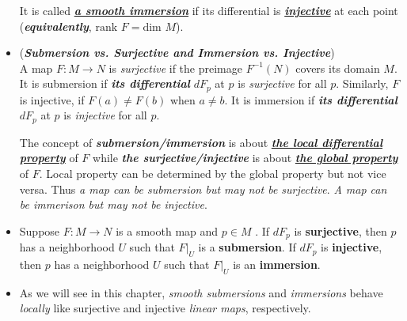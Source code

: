 \documentclass[11pt]{article}
\begin{document}
\begin{itemize}
\begin{definition}
It is called \underline{\emph{\textbf{a smooth immersion}}} if its differential is \underline{\emph{\textbf{injective}}} at each point (\emph{\textbf{equivalently}}, \underline{$\text{rank }F = \text{dim }M$}).
\end{definition}


\item \begin{remark} (\emph{\textbf{Submersion vs. Surjective and Immersion vs. Injective}})\\
A map $F: M \rightarrow N$ is \emph{surjective} if the preimage $F^{-1}(N)$ covers its domain $M$. It is submersion if \emph{\textbf{its differential}} $dF_p$ at $p$ is \emph{surjective} for all $p$. Similarly, $F$ is injective, if $F(a) \neq F(b)$ when $a \neq b$. It is immersion if \emph{\textbf{its differential}} $dF_p$ at $p$ is \emph{injective} for all $p$. 

The concept of \emph{\textbf{submersion/immersion}} is about \underline{\emph{\textbf{the local differential property}}} of $F$ while \emph{\textbf{the surjective/injective}} is about \underline{\emph{\textbf{the global property}}} of $F$.  Local property can be determined by the global property but not vice versa. Thus \emph{a map can be submersion but may not be surjective}.  \emph{A map can be immerison but may not be injective}. 
\end{remark}


\item \begin{proposition}
Suppose $F: M \rightarrow N$ is a smooth map and $p \in M$ . If $dF_p$ is \textbf{surjective}, then $p$ has a neighborhood $U$ such that $F|_{U}$ is a \textbf{submersion}. If $dF_p$ is \textbf{injective}, then $p$ has a neighborhood $U$ such that $F|_{U}$ is an \textbf{immersion}.
\end{proposition}

\item \begin{remark}
As we will see in this chapter, \emph{smooth submersions} and \emph{immersions} behave \emph{locally} like surjective and injective \emph{linear maps}, respectively. 
\end{remark}


\end{itemize}
\end{document}
